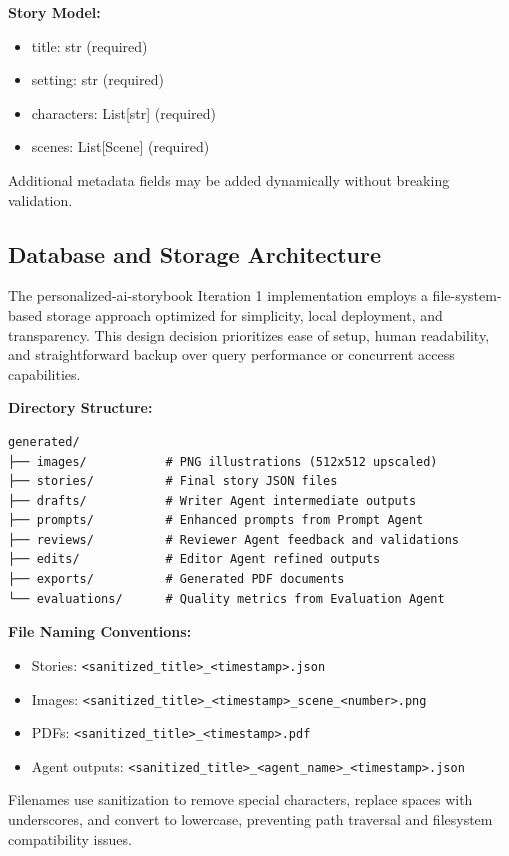 \textbf{Story Model:}
\begin{itemize}
    \item title: str (required)
    \item setting: str (required)
    \item characters: List[str] (required)
    \item scenes: List[Scene] (required)
\end{itemize}

Additional metadata fields may be added dynamically without breaking validation.

\subsection{Database and Storage Architecture}
The personalized-ai-storybook Iteration 1 implementation employs a file-system-based storage approach optimized for simplicity, local deployment, and transparency. This design decision prioritizes ease of setup, human readability, and straightforward backup over query performance or concurrent access capabilities.

\textbf{Directory Structure:}
\begin{verbatim}
generated/
├── images/           # PNG illustrations (512x512 upscaled)
├── stories/          # Final story JSON files
├── drafts/           # Writer Agent intermediate outputs
├── prompts/          # Enhanced prompts from Prompt Agent
├── reviews/          # Reviewer Agent feedback and validations
├── edits/            # Editor Agent refined outputs
├── exports/          # Generated PDF documents
└── evaluations/      # Quality metrics from Evaluation Agent
\end{verbatim}

\textbf{File Naming Conventions:}
\begin{itemize}
    \item Stories: \texttt{<sanitized\_title>\_<timestamp>.json}
    \item Images: \texttt{<sanitized\_title>\_<timestamp>\_scene\_<number>.png}
    \item PDFs: \texttt{<sanitized\_title>\_<timestamp>.pdf}
    \item Agent outputs: \texttt{<sanitized\_title>\_<agent\_name>\_<timestamp>.json}
\end{itemize}

Filenames use sanitization to remove special characters, replace spaces with underscores, and convert to lowercase, preventing path traversal and filesystem compatibility issues.

